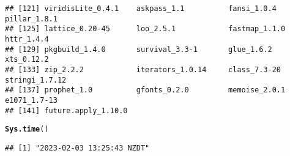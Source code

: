 \documentclass{article}\usepackage[]{graphicx}\usepackage[]{xcolor}
\makeatletter
\newcommand{\hlstd}[1]{\textcolor[rgb]{0.345,0.345,0.345}{#1}}%
\newcommand{\hlkwd}[1]{\textcolor[rgb]{0.737,0.353,0.396}{\textbf{#1}}}%
\newenvironment{kframe}{%
 \def\at@end@of@kframe{}%
 \ifinner\ifhmode%
  \def\at@end@of@kframe{\end{minipage}}%
  \begin{minipage}{\columnwidth}%
 \fi\fi%
 \def\FrameCommand##1{\hskip\@totalleftmargin \hskip-\fboxsep
 \colorbox{shadecolor}{##1}\hskip-\fboxsep
     \hskip-\linewidth \hskip-\@totalleftmargin \hskip\columnwidth}%
 \MakeFramed {\advance\hsize-\width
   \@totalleftmargin\z@ \linewidth\hsize
   \@setminipage}}%
 {\par\unskip\endMakeFramed%
 \at@end@of@kframe}
\newenvironment{knitrout}{}{} %
\makeatother
\begin{document}
\begin{knitrout}
\begin{kframe}
\begin{verbatim}
## [121] viridisLite_0.4.1    askpass_1.1          fansi_1.0.4          pillar_1.8.1        
## [125] lattice_0.20-45      loo_2.5.1            fastmap_1.1.0        httr_1.4.4          
## [129] pkgbuild_1.4.0       survival_3.3-1       glue_1.6.2           xts_0.12.2          
## [133] zip_2.2.2            iterators_1.0.14     class_7.3-20         stringi_1.7.12      
## [137] prophet_1.0          gfonts_0.2.0         memoise_2.0.1        e1071_1.7-13        
## [141] future.apply_1.10.0
\end{verbatim}
\begin{alltt}
\hlkwd{Sys.time}\hlstd{()}
\end{alltt}
\begin{verbatim}
## [1] "2023-02-03 13:25:43 NZDT"
\end{verbatim}
\end{kframe}
\end{knitrout}
\end{document}
